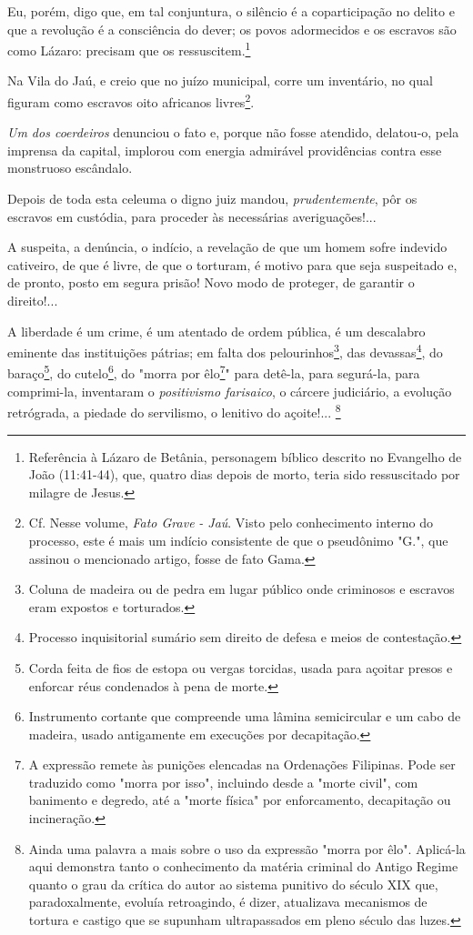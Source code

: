Eu, porém, digo que, em tal conjuntura, o silêncio é a coparticipação no
delito e que a revolução é a consciência do dever; os povos adormecidos
e os escravos são como Lázaro: precisam que os ressuscitem.\footnote{
  Referência à Lázaro de Betânia, personagem bíblico descrito no
  Evangelho de João (11:41-44), que, quatro dias depois de morto, teria
  sido ressuscitado por milagre de Jesus.}

Na Vila do Jaú, e creio que no juízo municipal, corre um inventário, no
qual figuram como escravos oito africanos livres\footnote{Cf. Nesse
  volume, \emph{Fato Grave} \emph{- Jaú}. Visto pelo conhecimento
  interno do processo, este é mais um indício consistente de que o
  pseudônimo "G.", que assinou o mencionado artigo, fosse de fato Gama.}.

\emph{Um dos coerdeiros} denunciou o fato e, porque não fosse atendido,
delatou-o, pela imprensa da capital, implorou com energia admirável
providências contra esse monstruoso escândalo.

Depois de toda esta celeuma o digno juiz mandou, \emph{prudentemente},
pôr os escravos em custódia, para proceder às necessárias
averiguações!...

A suspeita, a denúncia, o indício, a revelação de que um homem sofre
indevido cativeiro, de que é livre, de que o torturam, é motivo para que
seja suspeitado e, de pronto, posto em segura prisão! Novo modo de
proteger, de garantir o direito!...

A liberdade é um crime, é um atentado de ordem pública, é um descalabro
eminente das instituições pátrias; em falta dos pelourinhos\footnote{
  Coluna de madeira ou de pedra em lugar público onde criminosos e
  escravos eram expostos e torturados.}, das devassas\footnote{
  Processo inquisitorial sumário sem direito de defesa e meios de
  contestação.}, do baraço\footnote{Corda feita de fios de estopa ou
  vergas torcidas, usada para açoitar presos e enforcar réus condenados
  à pena de morte.}, do cutelo\footnote{Instrumento cortante que
  compreende uma lâmina semicircular e um cabo de madeira, usado
  antigamente em execuções por decapitação.}, do "morra por
êlo\footnote{A expressão remete às punições elencadas na Ordenações
  Filipinas. Pode ser traduzido como "morra por isso", incluindo desde a
  "morte civil", com banimento e degredo, até a "morte física" por
  enforcamento, decapitação ou incineração.}" para detê-la, para
segurá-la, para comprimi-la, inventaram o \emph{positivismo farisaico},
o cárcere judiciário, a evolução retrógrada, a piedade do servilismo, o
lenitivo do açoite!... \footnote{Ainda uma palavra a mais sobre o uso
  da expressão "morra por êlo". Aplicá-la aqui demonstra tanto o
  conhecimento da matéria criminal do Antigo Regime quanto o grau da
  crítica do autor ao sistema punitivo do século XIX que,
  paradoxalmente, evoluía retroagindo, é dizer, atualizava mecanismos de
  tortura e castigo que se supunham ultrapassados em pleno século das
  luzes.}

